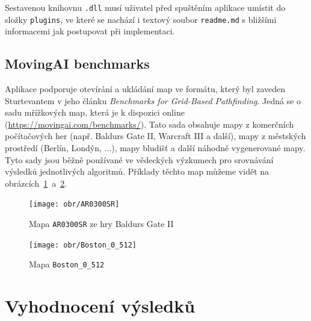 Sestavenou knihovnu \texttt{.dll} musí uživatel před spuštěním aplikace umístit do složky \texttt{plugins}, ve které se nachází i textový soubor \texttt{readme.md} s bližšími informacemi jak postupovat při implementaci.




\section{MovingAI benchmarks}\label{sec:movingAI}
Aplikace podporuje otevírání a ukládání map ve formátu, který byl zaveden Sturtevantem \cite{Sturtevant2012} v jeho článku \emph{Benchmarks for Grid-Based Pathfinding}. Jedná se o sadu mřížkových map, která je k dispozici online (\url{https://movingai.com/benchmarks/}). Tato sada obsahuje mapy z komerčních počítačových her (např. Baldurs Gate II, Warcraft III a další), mapy z městských prostředí (Berlín, Londýn, ...), mapy bludišť a další náhodně vygenerované mapy. Tyto sady jsou běžně používané ve vědeckých výzkumech pro srovnávání výsledků jednotlivých algoritmů. Příklady těchto map můžeme vidět na obrázcích~\ref{obr:AR0300SR}~a~\ref{obr:Boston}.




\begin{figure}[htb]
	\begin{center}
		\texttt{[image: obr/AR0300SR]}
	\end{center}
	\caption[caption]{Mapa \texttt{AR0300SR} ze hry Baldurs Gate II \cite{Sturtevant2012}}
	\label{obr:AR0300SR}
\end{figure}

\begin{figure}[htb]
	\begin{center}
		\texttt{[image: obr/Boston\_0\_512]}
	\end{center}
	\caption[caption]{Mapa \texttt{Boston\_0\_512} \cite{Sturtevant2012}}
	\label{obr:Boston}
\end{figure}



\clearpage
\chapter{Vyhodnocení výsledků}

\clearpage
